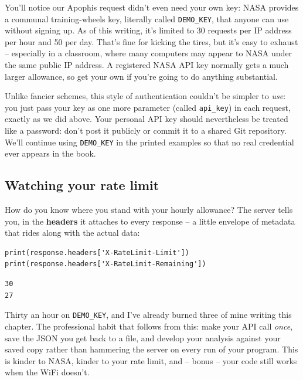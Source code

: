 
You'll notice our Apophis request didn't even need your own key: NASA provides
a communal training-wheels key, literally called \texttt{DEMO\_KEY}, that
anyone can use without signing up. As of this writing, it's limited to 30
requests per IP address per hour and 50 per day. That's fine for kicking the
tires, but it's easy to exhaust -- especially in a classroom, where many
computers may appear to NASA under the same public IP address. A registered
NASA API key normally gets a much larger allowance, so get your own if you're
going to do anything substantial.

Unlike fancier schemes, this style of authentication couldn't be simpler to
\textit{use}: you just pass your key as one more parameter (called
\texttt{api\_key}) in each request, exactly as we did above. Your personal API
key should nevertheless be treated like a password: don't post it publicly or
commit it to a shared Git repository. We'll continue using
\texttt{DEMO\_KEY} in the printed examples so that no real credential ever
appears in the book.

\subsection{Watching your rate limit}


How do you know where you stand with your hourly allowance? The server tells
you, in the \textbf{headers} it attaches to every response -- a little
envelope of metadata that rides along with the actual data:

\begin{Verbatim}[fontsize=\small,samepage=true,frame=single,framesep=3mm]
print(response.headers['X-RateLimit-Limit'])
print(response.headers['X-RateLimit-Remaining'])
\end{Verbatim}
\vspace{-.2in}

\begin{Verbatim}[fontsize=\small,samepage=true,frame=leftline,framesep=5mm,framerule=1mm]
30
27
\end{Verbatim}


Thirty an hour on \texttt{DEMO\_KEY}, and I've already burned three of mine
writing this chapter. The professional habit that follows from this: make your
API call \textit{once}, save the JSON you get back to a file, and develop your
analysis against your saved copy rather than hammering the server on every
run of your program. This is kinder to NASA, kinder to your rate limit, and --
bonus -- your code still works when the WiFi doesn't.

